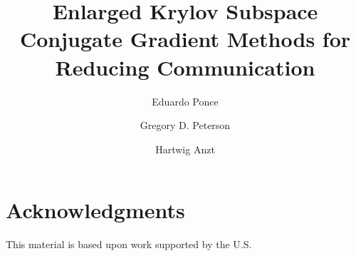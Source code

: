 \documentclass[12pt]{article}
\begin{document}
\title{Enlarged Krylov Subspace Conjugate Gradient Methods for Reducing Communication}
\author{Eduardo Ponce \and Gregory D. Peterson \and Hartwig Anzt}
\maketitle




\section*{Acknowledgments}
This material is based upon work supported by the U.S.



\end{document}

